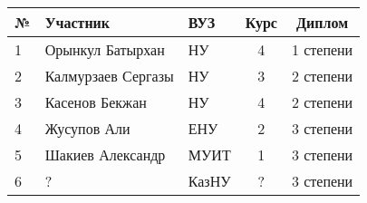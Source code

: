 \begin{center}
\begin{tabular}{|l|l|l|c|c|}
\hline
№ & Участник & ВУЗ & Курс & Диплом \\
\hline
1 & Орынкул Батырхан & НУ & 4 & 1 степени \\
\hline
2 & Калмурзаев Сергазы & НУ & 3 & 2 степени \\
\hline
3 & Касенов Бекжан & НУ & 4 & 2 степени \\
\hline
4 & Жусупов Али & ЕНУ & 2 & 3 степени \\
\hline
5 & Шакиев Александр & МУИТ & 1 & 3 степени \\
\hline
6 & ? & КазНУ & ? & 3 степени \\
\hline
\end{tabular}
\end{center}

